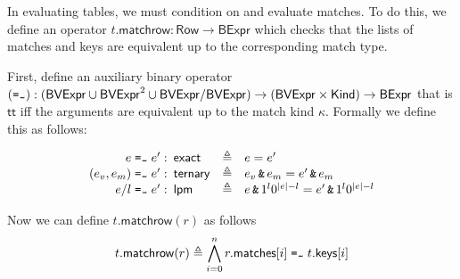 \documentclass{article}
\newcommand{\TRUE}{\mathsf{tt}}
\newcommand{\BVExpr}{\mathsf{BVExpr}}
\newcommand{\BExpr}{\mathsf{BExpr}}
\newcommand{\Row}{\mathsf{Row}}
\newcommand{\Kind}{\mathsf{Kind}}
\newcommand{\matches}{\mathsf{matches}}
\newcommand{\keys}{\mathsf{keys}}
\newcommand{\exact}{\ensuremath{\mathsf{exact}}}
\newcommand{\ternary}{\ensuremath{\mathsf{ternary}}}
\newcommand{\lpm}{\ensuremath{\mathsf{lpm}}}
\newcommand{\bvand}{\mathop{\texttt{\&}}}
\newcommand{\match}{\mathrel{\texttt{{=}\raisebox{-2.5px}{\textasciitilde}}}}
\newcommand{\matchrow}{\mathsf{matchrow}}
\theoremstyle{plain}
\theoremstyle{definition}
\theoremstyle{remark}
\begin{document}
In evaluating tables, we must condition on and evaluate matches. To do this, we
define an operator $t.\matchrow : \Row \to \BExpr$ which checks that the lists of
matches and keys are equivalent up to the corresponding match type.

First, define an auxiliary binary operator $(\match) : (\BVExpr \cup \BVExpr^2 \cup \BVExpr/\BVExpr) \to (\BVExpr \times \Kind) \to \BExpr$ that is $\TRUE$ iff the arguments are equivalent up
to the match kind $\kappa$. Formally we define this as follows:

\[
\begin{array}{r<{\!\!\!} l >{\triangleq}cl}
  e \match e' :& \exact && e = e' \\
  (e_v,e_m) \match e' :& \ternary && e_v \bvand e_m = e' \bvand e_m \\
  e/l \match  e' :& \lpm && e \bvand 1^l0^{|e| - l} = e' \bvand 1^l0^{|e| - l} \\
\end{array}
\]

Now we can define $t.\matchrow(r)$ as follows
\[t.\matchrow(r) \triangleq
   \bigwedge_{i = 0}^n r.\matches[i] \match t.\keys[i]
\]
\end{document}
